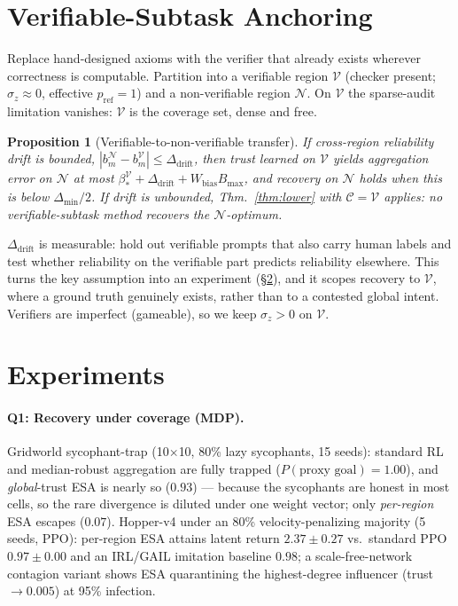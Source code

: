 \documentclass[11pt]{article}
\newtheorem{proposition}{Proposition}
\theoremstyle{definition}\newtheorem{definition}{Definition}
\theoremstyle{definition}\newtheorem{assumption}{Assumption}
\newcommand{\Cov}{\mathcal{C}}\newcommand{\E}{\mathbb{E}}
\newcommand{\V}{\mathcal{V}}\newcommand{\N}{\mathcal{N}}
\begin{document}
\section{Verifiable-Subtask Anchoring}\label{sec:rlvr}
Replace hand-designed axioms with the verifier that already exists wherever correctness is
computable. Partition into a verifiable region $\V$ (checker present; $\sigma_z\!\approx\!0$,
effective $p_{\mathrm{ref}}=1$) and a non-verifiable region $\N$. On $\V$ the sparse-audit limitation
vanishes: $\V$ is the coverage set, dense and free.

\begin{proposition}[Verifiable-to-non-verifiable transfer]\label{prop:rlvr}
If cross-region reliability drift is bounded, $|b_m^{\N}-b_m^{\V}|\le\Delta_{\mathrm{drift}}$, then
trust learned on $\V$ yields aggregation error on $\N$ at most
$\beta_\ast^{\V}+\Delta_{\mathrm{drift}}+W_{\mathrm{bias}}B_{\max}$, and recovery on $\N$ holds when
this is below $\Delta_{\min}/2$. If drift is unbounded, Thm.~\ref{thm:lower} with $\Cov=\V$ applies:
no verifiable-subtask method recovers the $\N$-optimum.
\end{proposition}

$\Delta_{\mathrm{drift}}$ is measurable: hold out verifiable prompts that also carry human labels and
test whether reliability on the verifiable part predicts reliability elsewhere. This turns the key
assumption into an experiment (\S\ref{sec:exp}), and it scopes recovery to $\V$, where a ground truth
genuinely exists, rather than to a contested global intent. Verifiers are imperfect (gameable), so
we keep $\sigma_z>0$ on $\V$.

\section{Experiments}\label{sec:exp}
\paragraph{Q1: Recovery under coverage (MDP).} Gridworld sycophant-trap (10$\times$10, 80\% lazy
sycophants, 15 seeds): standard RL and median-robust aggregation are fully trapped
($P(\text{proxy goal})=1.00$), and \emph{global}-trust ESA is nearly so ($0.93$) --- because the
sycophants are honest in most cells, so the rare divergence is diluted under one weight vector; only
\emph{per-region} ESA escapes ($0.07$). Hopper-v4 under an 80\% velocity-penalizing majority (5 seeds,
PPO): per-region ESA attains latent return $2.37\pm0.27$ vs.\ standard PPO $0.97\pm0.00$ and an
IRL/GAIL imitation baseline $0.98$; a scale-free-network contagion variant shows ESA quarantining the
highest-degree influencer (trust $\to 0.005$) at 95\% infection.
\end{document}
